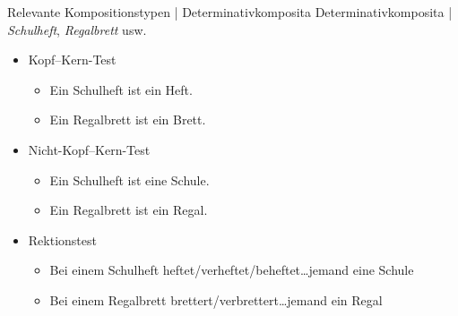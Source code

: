 \begin{frame}
  {Relevante Kompositionstypen | Determinativkomposita}
  \onslide<+->
  Determinativkomposita | \textit{Schulheft}, \textit{Regalbrett} usw.
  \Halbzeile
  \begin{itemize}[<+->]
    \item Kopf--Kern-Test
      \begin{itemize}[<+->]
        \item Ein Schulheft ist ein Heft. \gruen{\Ck}
        \item Ein Regalbrett ist ein Brett. \gruen{\Ck}
      \end{itemize}
    \item Nicht-Kopf--Kern-Test
      \begin{itemize}[<+->]
        \item Ein Schulheft ist eine Schule. \rot{\Fl}
        \item Ein Regalbrett ist ein Regal. \rot{\Fl}
      \end{itemize}
      \Halbzeile
    \item Rektionstest
      \begin{itemize}[<+->]
        \item Bei einem Schulheft heftet\slash verheftet\slash beheftet\ldots jemand eine Schule \rot{\Fl}
        \item Bei einem Regalbrett brettert\slash verbrettert\dots jemand ein Regal \rot{\Fl}
      \end{itemize}
  \end{itemize}
\end{frame}


